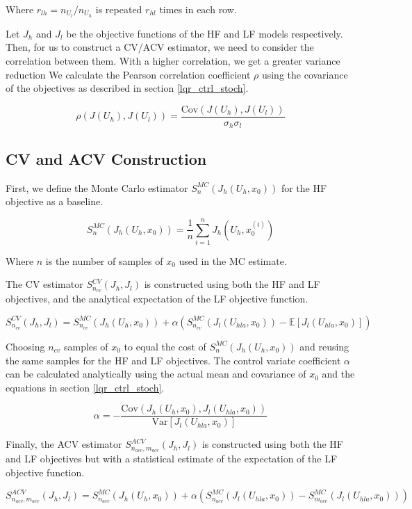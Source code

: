\documentclass{article}
\begin{document}
Where $r_{lh} = n_{U_l} / n_{U_h}$ is repeated $r_{hl}$ times in each row.

Let $J_h$ and $J_l$ be the objective functions of the HF and LF models respectively. Then, for us to construct a
CV/ACV estimator, we need to consider the correlation between them. With a higher correlation, we get a greater variance reduction
We calculate the Pearson correlation coefficient $\rho$ using the covariance of the objectives
as described in section \ref{lqr_ctrl_stoch}.

\begin{equation}
  \rho(J(U_h), J(U_l)) = \frac{\text{Cov}(J(U_h), J(U_l))}{\sigma_h \sigma_l}
\end{equation}

\subsection{CV and ACV Construction}

First, we define the Monte Carlo estimator $S_n^{MC}(J_h(U_h, x_0))$ for the HF objective as a baseline.

$$
S_n^{MC}(J_h(U_h, x_0)) = \frac{1}{n} \sum_{i=1}^{n} J_h(U_h, x_0^{(i)})
$$

Where $n$ is the number of samples of $x_0$ used in the MC estimate.

The CV estimator $S_{n_{cv}}^{CV}(J_h, J_l)$ is constructed using both the HF and LF objectives, and the
analytical expectation of the LF objective function.

$$
S_{n_{cv}}^{CV}(J_h, J_l) = S_{n_{cv}}^{MC}(J_h(U_h, x_0)) + \alpha (S_{n_{cv}}^{MC}(J_l(U_{hla}, x_0)) - \mathbb{E}[J_l(U_{hla}, x_0)])
$$

Choosing $n_{cv}$ samples of $x_0$ to equal the cost of $S_n^{MC}(J_h(U_h, x_0))$ and reusing the same samples for the HF and LF objectives.
The control variate coefficient $\alpha$ can be calculated analytically using the actual mean and covariance of $x_0$
and the equations in section \ref{lqr_ctrl_stoch}.

$$
\alpha = -\frac{\text{Cov}(J_h(U_h, x_0), J_l(U_{hla}, x_0))}{\text{Var}[J_l(U_{hla}, x_0)]}
$$

Finally, the ACV estimator $S_{n_{acv},m_{acv}}^{ACV}(J_h, J_l)$ is constructed using both the HF and LF objectives but with
a statistical estimate of the expectation of the LF objective function.

$$
S_{n_{acv},m_{acv}}^{ACV}(J_h, J_l) = S_{n_{acv}}^{MC}(J_h(U_h, x_0)) + \alpha (S_{n_{acv}}^{MC}(J_l(U_{hla}, x_0)) - S_{m_{acv}}^{MC}(J_l(U_{hla}, x_0)))
$$
\end{document}
